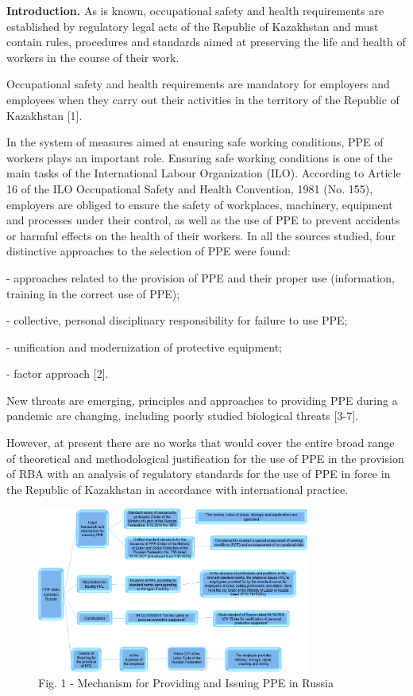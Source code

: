 \begin{multicols}{2}
{\bfseries Introduction.} As is known, occupational safety and health
requirements are established by regulatory legal acts of the Republic of
Kazakhstan and must contain rules, procedures and standards aimed at
preserving the life and health of workers in the course of their work.

Occupational safety and health requirements are mandatory for employers
and employees when they carry out their activities in the territory of
the Republic of Kazakhstan {[}1{]}.

In the system of measures aimed at ensuring safe working conditions, PPE
of workers plays an important role. Ensuring safe working conditions is
one of the main tasks of the International Labour Organization (ILO).
According to Article 16 of the ILO Occupational Safety and Health
Convention, 1981 (No. 155), employers are obliged to ensure the safety
of workplaces, machinery, equipment and processes under their control,
as well as the use of PPE to prevent accidents or harmful effects on the
health of their workers. In all the sources studied, four distinctive
approaches to the selection of PPE were found:

- approaches related to the provision of PPE and their proper use
(information, training in the correct use of PPE);

- collective, personal disciplinary responsibility for failure to use
PPE;

- unification and modernization of protective equipment;

- factor approach {[}2{]}.

New threats are emerging, principles and approaches to providing PPE
during a pandemic are changing, including poorly studied biological
threats {[}3-7{]}.

However, at present there are no works that would cover the entire broad
range of theoretical and methodological justification for the use of PPE
in the provision of RBA with an analysis of regulatory standards for the
use of PPE in force in the Republic of Kazakhstan in accordance with
international practice.
\end{multicols}

\begin{figure}[H]
	\centering
	\includegraphics[width=0.8\textwidth]{media/chem2/image2}
	\caption*{Fig. 1 - Mechanism for Providing and Issuing PPE in Russia}
\end{figure}

